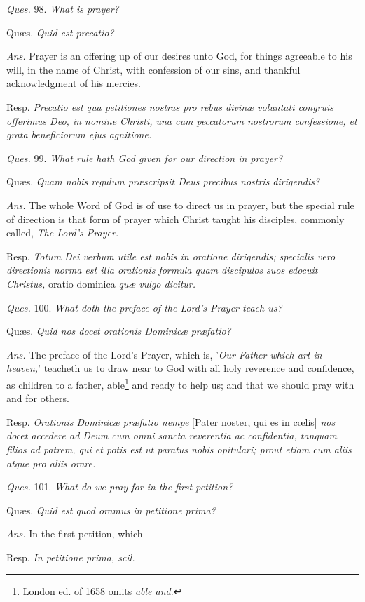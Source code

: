 \emph{Ques.} 98. \emph{What is prayer?}

Quæs. \emph{Quid est precatio?}

\emph{Ans.} Prayer is an offering up of our desires unto God, for things agreeable to his will, in the name of Christ, with confession of our sins, and thankful acknowledgment of his mercies.

Resp. \emph{Precatio est qua petitiones nostras pro rebus divinæ voluntati congruis offerimus Deo, in nomine Christi, una cum peccatorum nostrorum confessione, et grata beneficiorum ejus agnitione.}

\emph{Ques.} 99. \emph{What rule hath God given for our direction in prayer?}

Quæs. \emph{Quam nobis regulum præscripsit Deus precibus nostris dirigendis?}

\emph{Ans.} The whole Word of God is of use to direct us in prayer, but the special rule of direction is that form of prayer which Christ taught his disciples, commonly called, \emph{The Lord's Prayer.}

Resp. \emph{Totum Dei verbum utile est nobis in oratione dirigendis; specialis vero directionis norma est illa orationis formula quam discipulos suos edocuit Christus, }oratio dominica \emph{quæ vulgo dicitur.}

\emph{Ques.} 100. \emph{What doth the preface of the Lord's Prayer teach us?}

Quæs. \emph{Quid nos docet orationis Dominicæ præfatio?}

\emph{Ans.} The preface of the Lord's Prayer, which is, '\emph{Our Father which art in heaven,}' teacheth us to draw near to God with all holy reverence and confidence, as children to a father, able\footnote{London ed. of 1658 omits \emph{able and}.} and ready to help us; and that we should pray with and for others.

Resp. \emph{Orationis Dominicæ præfatio nempe} [Pater noster, qui es in cœlis] \emph{nos docet accedere ad Deum cum omni sancta reverentia ac confidentia, tanquam filios ad patrem, qui et potis est ut paratus nobis opitulari; prout etiam cum aliis atque pro aliis orare.}

\emph{Ques.} 101. \emph{What do we pray for in the first petition?}

Quæs. \emph{Quid est quod oramus in petitione prima?}

\emph{Ans.} In the first petition, which

Resp. \emph{In petitione prima, scil. }

